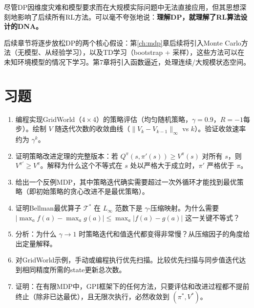尽管DP因维度灾难和模型要求而在大规模实际问题中无法直接应用，但其思想深刻地影响了后续所有RL方法。可以毫不夸张地说：\textbf{理解DP，就理解了RL算法设计的DNA。}

后续章节将逐步放松DP的两个核心假设：第\ref{ch:mdp}章后续将引入Monte Carlo方法（无模型、从经验学习），以及TD学习（bootstrap + 采样），这些方法可以在未知环境模型的情况下学习。第7章将引入函数逼近，处理连续/大规模状态空间。

\section*{习题}

\begin{enumerate}
    \item 编程实现GridWorld（$4 \times 4$）的策略评估（均匀随机策略，$\gamma=0.9$，$R=-1$每步）。绘制 $V$ 随迭代次数的收敛曲线（$\|V_k - V_{k-1}\|_\infty$ vs $k$）。验证收敛速率约为 $\gamma^k$。
    
    \item 证明策略改进定理的完整版本：若 $Q^{\pi}(s, \pi'(s)) \ge V^{\pi}(s)$ 对所有 $s$，则 $V^{\pi'} \ge V^{\pi}$。解释为什么这个不等式在 $s$ 处以严格大于成立时，$\pi'$ 严格优于 $\pi$。
    
    \item 给出一个反例MDP，其中策略迭代确实需要超过一次外循环才能找到最优策略（即初始策略的贪心改进不是最优策略）。
    
    \item 证明Bellman最优算子 $\mathcal{T}^{*}$ 在 $L_\infty$ 范数下是 $\gamma$-压缩映射。为什么需要 $|\max_a f(a) - \max_a g(a)| \le \max_a |f(a) - g(a)|$ 这一关键不等式？
    
    \item 分析：为什么 $\gamma \to 1$ 时策略迭代和值迭代都变得非常慢？从压缩因子的角度给出定量解释。
    
    \item 对GridWorld示例，手动或编程执行优先扫描。比较优先扫描与同步值迭代达到相同精度所需的state更新总次数。
    
    \item 证明：在有限MDP中，GPI框架下的任何方法，只要评估和改进过程都不提前终止（除非已达最优），且无限次执行，必然收敛到 $(\pi^{*}, V^{*})$。
\end{enumerate}
